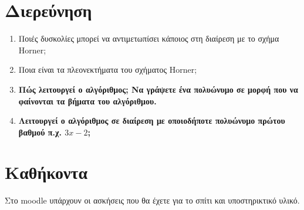 \documentclass[a4paper,12pt]{article}
\begin{document}
\section{Διερεύνηση}

\begin{enumerate}
  \item Ποιές δυσκολίες μπορεί να αντιμετωπίσει κάποιος στη διαίρεση με το σχήμα Horner;
  \item Ποια είναι τα πλεονεκτήματα του σχήματος Horner;
  \item \textbf{Πώς λειτουργεί ο αλγόριθμος; Να γράψετε ένα πολυώνυμο σε μορφή που να φαίνονται τα βήματα του αλγόριθμου.}
  \item \textbf{Λειτουργεί ο αλγόριθμος σε διαίρεση με οποιοδήποτε πολυώνυμο πρώτου βαθμού π.χ. $3x-2$;}
\end{enumerate}

\section{Καθήκοντα}

Στο moodle υπάρχουν οι ασκήσεις που θα έχετε για το σπίτι και υποστηρικτικό υλικό.
\end{document}
